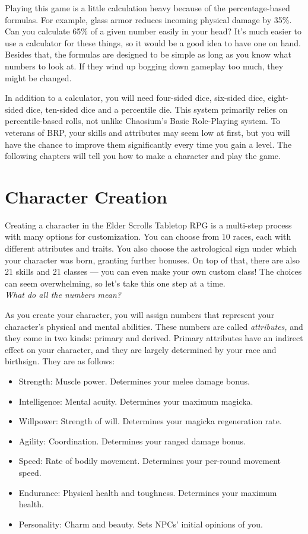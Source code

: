 \documentclass[12pt]{book}
\begin{document}
Playing this game is a little calculation heavy because of the percentage-based formulas. For example, glass armor reduces incoming physical damage by 35\%. Can you calculate 65\% of a given number easily in your head? It's much easier to use a calculator for these things, so it would be a good idea to have one on hand. Besides that, the formulas are designed to be simple as long as you know what numbers to look at. If they wind up bogging down gameplay too much, they might be changed.

In addition to a calculator, you will need four-sided dice, six-sided dice, eight-sided dice, ten-sided dice and a percentile die. This system primarily relies on percentile-based rolls, not unlike Chaosium's Basic Role-Playing system. To veterans of BRP, your skills and attributes may seem low at first, but you will have the chance to improve them significantly every time you gain a level. The following chapters will tell you how to make a character and play the game.
\newpage
\noindent
\chapter{Character Creation}

Creating a character in the Elder Scrolls Tabletop RPG is a multi-step process with many options for customization. You can choose from 10 races, each with different attributes and traits. You also choose the astrological sign under which your character was born, granting further bonuses. On top of that, there are also 21 skills and 21 classes --- you can even make your own custom class! The choices can seem overwhelming, so let's take this one step at a time.\\

\noindent
\textit{What do all the numbers mean?}

As you create your character, you will assign numbers that represent your character's physical and mental abilities. These numbers are called \textit{attributes,} and they come in two kinds: primary and derived. Primary attributes have an indirect effect on your character, and they are largely determined by your race and birthsign. They are as follows:
\begin{itemize}
	\item Strength: Muscle power. Determines your melee damage bonus.
	\item Intelligence: Mental acuity. Determines your maximum magicka.
	\item Willpower: Strength of will. Determines your magicka regeneration rate.
	\item Agility: Coordination. Determines your ranged damage bonus.
	\item Speed: Rate of bodily movement. Determines your per-round movement speed.
	\item Endurance: Physical health and toughness. Determines your maximum health.
	\item Personality: Charm and beauty. Sets NPCs' initial opinions of you.
\end{itemize}
\end{document}
